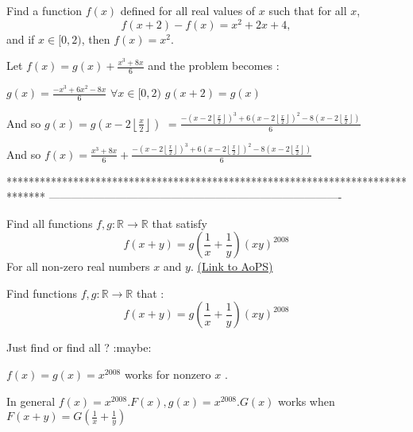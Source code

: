 \begin{solution}
	\begin{tcolorbox}Find a function $f(x)$ defined for all real values of $x$ such that for all $x$,
\[f(x+ 2) - f(x) = x^2 + 2x + 4,\]
and if $x \in [0, 2)$, then $f(x) = x^2.$\end{tcolorbox}
Let $f(x)=g(x)+\frac{x^3+8x}6$ and the problem becomes :

$g(x)=\frac{-x^3+6x^2-8x}6$ $\forall x\in[0,2)$
$g(x+2)=g(x)$

And so $g(x)=g(x-2\left\lfloor\frac x2\right\rfloor)$ $=\frac{-(x-2\left\lfloor\frac x2\right\rfloor)^3+6(x-2\left\lfloor\frac x2\right\rfloor)^2-8(x-2\left\lfloor\frac x2\right\rfloor)}6$

And so $\boxed{f(x)=\frac{x^3+8x}6+\frac{-(x-2\left\lfloor\frac x2\right\rfloor)^3+6(x-2\left\lfloor\frac x2\right\rfloor)^2-8(x-2\left\lfloor\frac x2\right\rfloor)}6}$
\end{solution}
*******************************************************************************
-------------------------------------------------------------------------------

\begin{problem}
	Find all functions $f,g : \mathbb{R} \to \mathbb{R}$ that satisfy
\[f(x+y)=g\left(\frac1x+\frac1y\right){(xy)}^{2008}\]
For all non-zero real numbers $x$ and $y$.
	\flushright \href{https://artofproblemsolving.com/community/c6h388782}{(Link to AoPS)}
\end{problem}



\begin{solution}
	\begin{tcolorbox}Find functions $f,g : \mathbb{R} \to \mathbb{R}$ that :
\[f(x+y)=g(\frac1x+\frac1y){(xy)}^{2008}\]\end{tcolorbox}
Just find or find all ? :maybe: 

$f(x)=g(x) = x^{2008}$ works for nonzero $x$ .

In general $f(x) = x^{2008} . F(x) , g(x)= x^{2008} .G(x) $ works when $F(x+y)=G(\frac{1}{x} + \frac{1}{y})$
\end{solution}



